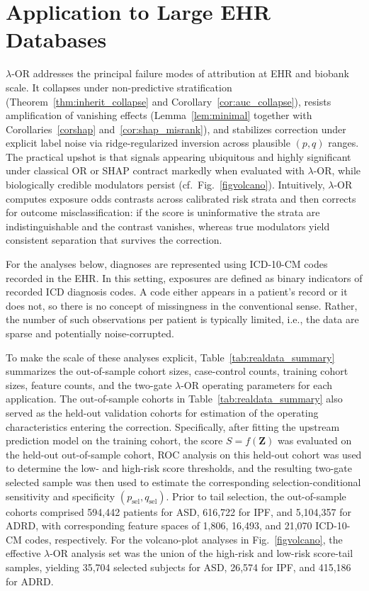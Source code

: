 \documentclass[pdflatex,sn-mathphys-num]{sn-jnl}%
\newcommand{\SPOR}{\textrm{$\lambda$-OR}}
\theoremstyle{thmstyleone}%
\theoremstyle{thmstyletwo}%
\theoremstyle{thmstylethree}%
\begin{document}
\section{Application to Large EHR Databases}

$\SPOR$ addresses the principal failure modes of attribution at EHR and biobank scale. It collapses under non-predictive stratification (Theorem~\ref{thm:inherit_collapse} and Corollary~\ref{cor:auc_collapse}), resists amplification of vanishing effects (Lemma~\ref{lem:minimal} together with Corollaries~\ref{corshap} and~\ref{cor:shap_misrank}), and stabilizes correction under explicit label noise via ridge-regularized inversion across plausible $(p,q)$ ranges. The practical upshot is that signals appearing ubiquitous and highly significant under classical OR or SHAP contract markedly when evaluated with $\SPOR$, while biologically credible modulators persist (cf.\ Fig.~\ref{figvolcano}). Intuitively, $\SPOR$ computes exposure odds contrasts across calibrated risk strata and then corrects for outcome misclassification: if the score is uninformative the strata are indistinguishable and the contrast vanishes, whereas true modulators yield consistent separation that survives the correction.

For the analyses below, diagnoses are represented using ICD-10-CM codes recorded in the EHR. In this setting, exposures are defined as binary indicators of recorded ICD diagnosis codes. A code either appears in a patient's record or it does not, so there is no concept of missingness in the conventional sense. Rather, the number of such observations per patient is typically limited, i.e., the data are sparse and potentially noise-corrupted.

To make the scale of these analyses explicit, Table~\ref{tab:realdata_summary} summarizes the out-of-sample cohort sizes, case-control counts, training cohort sizes, feature counts, and the two-gate $\SPOR$ operating parameters for each application. The out-of-sample cohorts in Table~\ref{tab:realdata_summary} also served as the held-out validation cohorts for estimation of the operating characteristics entering the correction. Specifically, after fitting the upstream prediction model on the training cohort, the score \(S=f(\mathbf Z)\) was evaluated on the held-out out-of-sample cohort, ROC analysis on this held-out cohort was used to determine the low- and high-risk score thresholds, and the resulting two-gate selected sample was then used to estimate the corresponding selection-conditional sensitivity and specificity \((p_{\mathrm{sel}}, q_{\mathrm{sel}})\). Prior to tail selection, the out-of-sample cohorts comprised 594,442 patients for ASD, 616,722 for IPF, and 5,104,357 for ADRD, with corresponding feature spaces of 1,806, 16,493, and 21,070 ICD-10-CM codes, respectively. For the volcano-plot analyses in Fig.~\ref{figvolcano}, the effective $\SPOR$ analysis set was the union of the high-risk and low-risk score-tail samples, yielding 35,704 selected subjects for ASD, 26,574 for IPF, and 415,186 for ADRD.
\end{document}
